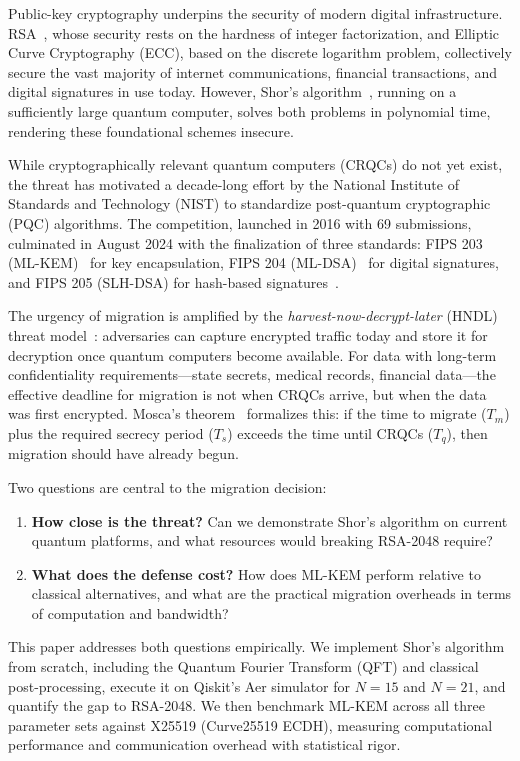 \documentclass[conference]{IEEEtran}
\begin{document}
Public-key cryptography underpins the security of modern digital infrastructure. RSA~\cite{rivest1978}, whose security rests on the hardness of integer factorization, and Elliptic Curve Cryptography (ECC), based on the discrete logarithm problem, collectively secure the vast majority of internet communications, financial transactions, and digital signatures in use today. However, Shor's algorithm~\cite{shor1994}, running on a sufficiently large quantum computer, solves both problems in polynomial time, rendering these foundational schemes insecure.

While cryptographically relevant quantum computers (CRQCs) do not yet exist, the threat has motivated a decade-long effort by the National Institute of Standards and Technology (NIST) to standardize post-quantum cryptographic (PQC) algorithms. The competition, launched in 2016 with 69 submissions, culminated in August 2024 with the finalization of three standards: FIPS 203 (ML-KEM)~\cite{fips203} for key encapsulation, FIPS 204 (ML-DSA)~\cite{fips204} for digital signatures, and FIPS 205 (SLH-DSA) for hash-based signatures~\cite{alagic2022}.

The urgency of migration is amplified by the \emph{harvest-now-decrypt-later} (HNDL) threat model~\cite{bernstein2017}: adversaries can capture encrypted traffic today and store it for decryption once quantum computers become available. For data with long-term confidentiality requirements---state secrets, medical records, financial data---the effective deadline for migration is not when CRQCs arrive, but when the data was first encrypted. Mosca's theorem~\cite{mosca2018} formalizes this: if the time to migrate ($T_m$) plus the required secrecy period ($T_s$) exceeds the time until CRQCs ($T_q$), then migration should have already begun.

Two questions are central to the migration decision:
\begin{enumerate}[leftmargin=*]
    \item \textbf{How close is the threat?} Can we demonstrate Shor's algorithm on current quantum platforms, and what resources would breaking RSA-2048 require?
    \item \textbf{What does the defense cost?} How does ML-KEM perform relative to classical alternatives, and what are the practical migration overheads in terms of computation and bandwidth?
\end{enumerate}

This paper addresses both questions empirically. We implement Shor's algorithm from scratch, including the Quantum Fourier Transform (QFT) and classical post-processing, execute it on Qiskit's Aer simulator for $N=15$ and $N=21$, and quantify the gap to RSA-2048. We then benchmark ML-KEM across all three parameter sets against X25519 (Curve25519 ECDH), measuring computational performance and communication overhead with statistical rigor.
\end{document}
